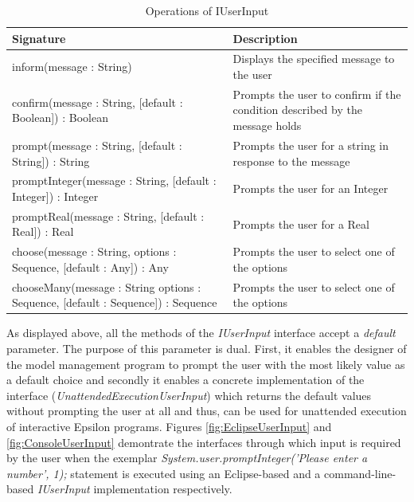 \begin{longtable} {|p{5.5cm}|p{6.5cm}|}
			
			\caption{Operations of IUserInput}
			\label{tab:IUserInputOperations}\\
			
			\hline
							
			\textbf{Signature} & \textbf{Description} \\\hline

			inform(message : String) & Displays the specified message to the user\\\hline
			
			confirm(message : String, [default : Boolean]) : Boolean & Prompts the user to confirm if the condition described by the message holds \\\hline
			
			prompt(message : String, [default : String]) : String & Prompts the user for a string in response to the message \\\hline
			
			promptInteger(message : String, [default : Integer]) : Integer & Prompts the user for an Integer \\\hline
			
			promptReal(message : String, [default : Real]) : Real & Prompts the user for a Real \\\hline
			
	 		choose(message : String, options : Sequence, [default : Any]) : Any & Prompts the user to select one of the options \\\hline
			
			chooseMany(message : String options : Sequence, [default : Sequence]) : Sequence & Prompts the user to select one of the options \\\hline
			
\end{longtable}

As displayed above, all the methods of the \emph{IUserInput} interface accept a \emph{default} parameter. The purpose of this parameter is dual. First, it enables the designer of the model management program to prompt the user with the most likely value as a default choice and secondly it enables a concrete implementation of the interface (\emph{UnattendedExecutionUserInput}) which returns the default values without prompting the user at all and thus, can be used for unattended execution of interactive Epsilon programs. Figures \ref{fig:EclipseUserInput} and \ref{fig:ConsoleUserInput} demontrate the interfaces through which input is required by the user when the exemplar \emph{System.user.promptInteger('Please enter a number', 1);} statement is executed using  an Eclipse-based and a command-line-based \emph{IUserInput} implementation respectively.

